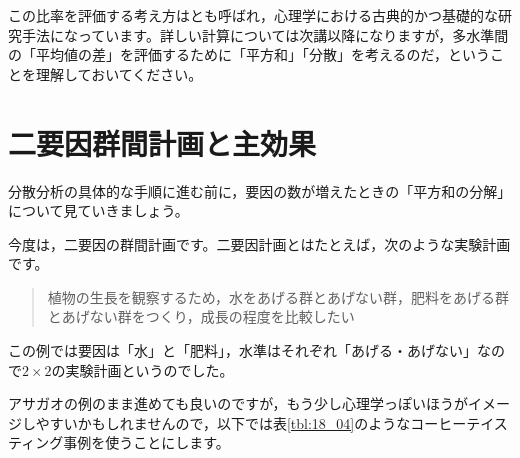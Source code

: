 \documentclass{ltjbook}
\begin{document}
この比率を評価する考え方はとも呼ばれ，心理学における古典的かつ基礎的な研究手法になっています。詳しい計算については次講以降になりますが，多水準間の「平均値の差」を評価するために「平方和」「分散」を考えるのだ，ということを理解しておいてください。

\section{二要因群間計画と主効果}
\label{Between2way}
分散分析の具体的な手順に進む前に，要因の数が増えたときの「平方和の分解」について見ていきましょう。

今度は，二要因の群間計画です。二要因計画とはたとえば，次のような実験計画です。

\begin{quote}
	植物の生長を観察するため，水をあげる群とあげない群，肥料をあげる群とあげない群をつくり，成長の程度を比較したい
\end{quote}

この例では要因は「水」と「肥料」，水準はそれぞれ「あげる・あげない」なので$2\times2$の実験計画というのでした。

アサガオの例のまま進めても良いのですが，もう少し心理学っぽいほうがイメージしやすいかもしれませんので，以下では表\ref{tbl:18_04}のようなコーヒーテイスティング事例を使うことにします。
\end{document}
